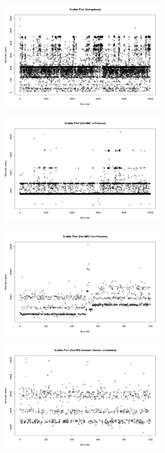 \documentclass[12pt]{article}
\begin{document}
\begin{figure}[H]
	\centering
	\includegraphics[width=0.75\textwidth]{./img/scatter_semaphore}
\end{figure}
\begin{figure}[H]
	\centering
	\includegraphics[width=0.75\textwidth]{./img/scatter_inproc}
\end{figure}
\begin{figure}[H]
	\centering
	\includegraphics[width=0.75\textwidth]{./img/scatter_ipc}
\end{figure}
\begin{figure}[H]
	\centering
	\includegraphics[width=0.75\textwidth]{./img/scatter_docker}
\end{figure}
\end{document}
